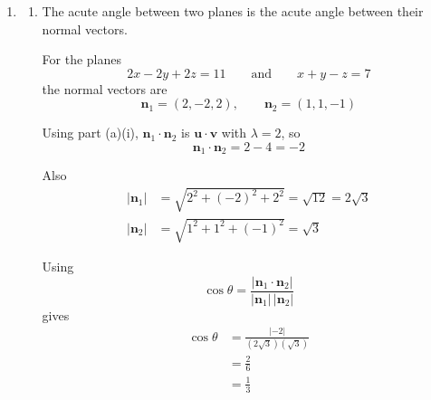 \documentclass[leqno]{article}
\begin{document}
\begin{enumerate}[
  label=\textbf{\arabic*.},
  leftmargin=*,
  topsep=0pt,
  partopsep=0pt,
  parsep=0pt
]
\begin{tcolorbox}[colback=white, colframe=scarlet, title={\textbf{Solution}}, breakable, grow to left by=6mm, grow to right by=10mm]
\begin{enumerate}[label=\textbf{(\alph*)}]
\begin{enumerate}[label=(\roman*)]
    \item
    \begin{align*}
    \mathbf{u}\times\mathbf{v}
    &=
    \begin{vmatrix}
    \mathbf{i} & \mathbf{j} & \mathbf{k}\\
    \lambda & -2 & 2\\
    1 & 1 & -1
    \end{vmatrix}\\
    &=
    \mathbf{i}\bigl((-2)(-1)-2(1)\bigr)
    -\mathbf{j}\bigl(\lambda(-1)-2(1)\bigr)
    +\mathbf{k}\bigl(\lambda(1)-(-2)(1)\bigr)\\
    &=
    \mathbf{i}(2-2)-\mathbf{j}(-\lambda-2)+\mathbf{k}(\lambda+2)\\
    &=
    0\mathbf{i}+(\lambda+2)\mathbf{j}+(\lambda+2)\mathbf{k}\\
    &=
    (\lambda+2)(\mathbf{j}+\mathbf{k})
    \end{align*}

    Hence
    \[
    \mathbf{u}\times\mathbf{v}=(\lambda+2)(\mathbf{j}+\mathbf{k})
    \]
  \end{enumerate}

  \item
  \begin{enumerate}[label=(\roman*)]
    \item
    The acute angle between two planes is the acute angle between their normal vectors.

    For the planes
    \[
    2x-2y+2z=11
    \qquad\text{and}\qquad
    x+y-z=7
    \]
    the normal vectors are
    \[
    \mathbf{n}_1=(2,-2,2),
    \qquad
    \mathbf{n}_2=(1,1,-1)
    \]

    Using part (a)(i), \(\mathbf{n}_1\cdot\mathbf{n}_2\) is \(\mathbf{u}\cdot\mathbf{v}\) with \(\lambda=2\), so
    \[
    \mathbf{n}_1\cdot\mathbf{n}_2=2-4=-2
    \]

    Also
    \begin{align*}
    \left\lvert\mathbf{n}_1\right\rvert
    &=\sqrt{2^2+(-2)^2+2^2}
    =\sqrt{12}
    =2\sqrt{3}\\
    \left\lvert\mathbf{n}_2\right\rvert
    &=\sqrt{1^2+1^2+(-1)^2}
    =\sqrt{3}
    \end{align*}

    Using
    \[
    \cos\theta
    =
    \frac{\left\lvert\mathbf{n}_1\cdot\mathbf{n}_2\right\rvert}
    {\left\lvert\mathbf{n}_1\right\rvert\,\left\lvert\mathbf{n}_2\right\rvert}
    \]
    gives
    \begin{align*}
    \cos\theta
    &=
    \frac{\left\lvert-2\right\rvert}{(2\sqrt{3})(\sqrt{3})}\\
    &=
    \frac{2}{6}\\
    &=
    \frac{1}{3}
    \end{align*}


\end{enumerate}
\end{enumerate}
\end{tcolorbox}
\end{enumerate}
\end{document}
